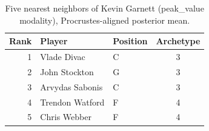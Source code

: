 \begin{table}[htbp]
  \centering\small
  \begin{tabular}{rllc}
    \toprule
    Rank & Player & Position & Archetype \\
    \midrule
    1 & Vlade Divac & C & 3 \\
    2 & John Stockton & G & 3 \\
    3 & Arvydas Sabonis & C & 3 \\
    4 & Trendon Watford & F & 4 \\
    5 & Chris Webber & F & 4 \\
    \bottomrule
  \end{tabular}
  \caption{Five nearest neighbors of Kevin Garnett (peak_value modality), Procrustes-aligned posterior mean.}
  \label{tab:Kevin_Garnett_neighbors_peak_value}
\end{table}

